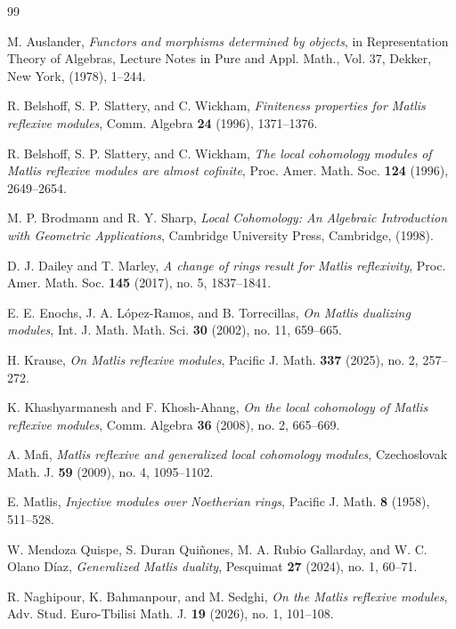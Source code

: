 \documentclass{kms-c}
\theoremstyle{plain}
\theoremstyle{definition}
\theoremstyle{remark}
\begin{document}
\begin{thebibliography}{99}

M. Auslander, {\it Functors and morphisms determined by objects}, in Representation Theory of Algebras, Lecture Notes in Pure and Appl. Math., Vol. 37, Dekker, New York, (1978), 1--244.

R. Belshoff, S. P. Slattery, and C. Wickham, {\it Finiteness properties for Matlis reflexive modules}, Comm. Algebra {\bf 24} (1996), 1371--1376.

R. Belshoff, S. P. Slattery, and C. Wickham, {\it The local cohomology modules of Matlis reflexive modules are almost cofinite}, Proc. Amer. Math. Soc. {\bf 124} (1996), 2649--2654.

M. P. Brodmann and R. Y. Sharp, {\it Local Cohomology: An Algebraic Introduction with Geometric Applications}, Cambridge University Press, Cambridge, (1998).

D. J. Dailey and T. Marley, {\it A change of rings result for Matlis reflexivity}, Proc. Amer. Math. Soc. {\bf 145} (2017), no. 5, 1837--1841.

E. E. Enochs, J. A. López-Ramos, and B. Torrecillas, {\it On Matlis dualizing modules}, Int. J. Math. Math. Sci. {\bf 30} (2002), no. 11, 659--665.

H. Krause, {\it On Matlis reflexive modules}, Pacific J. Math. {\bf 337} (2025), no. 2, 257--272.

K. Khashyarmanesh and F. Khosh-Ahang, {\it On the local cohomology of Matlis reflexive modules}, Comm. Algebra {\bf 36} (2008), no. 2, 665--669.

A. Mafi, {\it Matlis reflexive and generalized local cohomology modules}, Czechoslovak Math. J. {\bf 59} (2009), no. 4, 1095--1102.

E. Matlis, {\it Injective modules over Noetherian rings}, Pacific J. Math. {\bf 8} (1958), 511--528.

W. Mendoza Quispe, S. Duran Quiñones, M. A. Rubio Gallarday, and W. C. Olano Díaz, {\it Generalized Matlis duality}, Pesquimat {\bf 27} (2024), no. 1, 60--71.

R. Naghipour, K. Bahmanpour, and M. Sedghi, {\it On the Matlis reflexive modules}, Adv. Stud. Euro-Tbilisi Math. J. {\bf 19} (2026), no. 1, 101--108.

\end{thebibliography}
\end{document}
